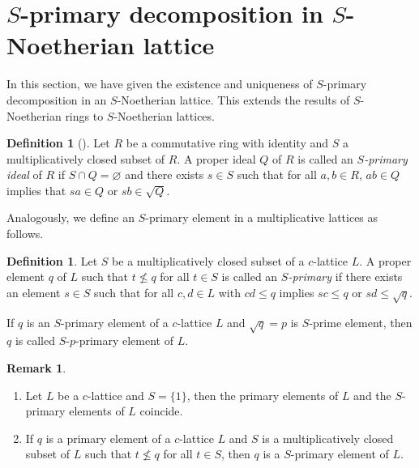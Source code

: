 \documentclass[10pt,twoside,a4]{amsart}
\numberwithin{equation}{section}
\theoremstyle{plain}
\theoremstyle{definition}
\newtheorem{rem}[lem]{Remark}
\newtheorem{defn}[lem]{Definition}
\newtheorem{definition}[lem]{Definition}
\begin{document}
\section{$S$-primary decomposition in $S$-Noetherian lattice}	
In this section, we have given the existence and uniqueness of  $S$-primary decomposition in an $S$-Noetherian lattice.  This extends the results of $S$-Noetherian rings to $S$-Noetherian lattices.

\begin{defn}[\cite{M,V}]
	Let $R$ be a commutative ring with identity and $S$ a multiplicatively closed subset of $R$.
	A proper ideal $Q$ of $R$ is called an \emph{$S$-primary ideal} of $R$ if
	$S\cap Q=\varnothing$ and there exists $s\in S$ such that for all $a,b\in R$,
	$ab\in Q$ implies that $sa\in Q$ or $sb\in \sqrt{Q}$.
\end{defn}

Analogously, we define an $S$-primary element in a multiplicative lattices as follows.

\begin{definition}  Let $S$ be a multiplicatively closed subset of a $c$-lattice $L$. A proper element $q$ of $L$ such that $t\nleq q$ for all $t\in S$ is called an \textit{$S$-primary } if there exists an element $s\in S$ such that for all $c,d \in L$ with $cd \leq q$  implies $sc \leq q$ or $sd \leq \sqrt q$. 
	
	
	If $q$ is an $S$-primary element of a $c$-lattice $L$ and  $\sqrt{q}=p$ is $S$-prime element, then  $q$ is called $S$-$p$-primary element of $L$. 
\end{definition}



\begin{rem}
	\begin{enumerate}
		
		\item Let $L$ be a $c$-lattice and $S=\{1\}$, then the primary elements of $L$ and the $S$-primary elements of $L$ coincide.
		\item  If $q$ is a primary element of a $c$-lattice $L$ and $S$ is a multiplicatively closed subset of $L$ such that $t\nleq q$ for all $t\in S$, then $q$ is a $S$-primary element of $L$.
		
	\end{enumerate}
\end{rem}
\end{document}
